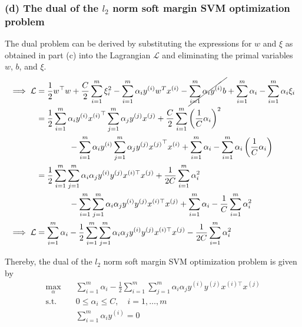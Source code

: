 \subsubsection*{(d) The dual of the \( l_{2} \) norm soft margin SVM optimization problem}

The dual problem can be derived by substituting the expressions for \( w \) and \( \xi \) as obtained in part (c) into the Lagrangian \( \mathcal{L} \) and eliminating the primal variables \( w \), \( b \), and \( \xi \).
\begin{align*}
    \implies
    \mathcal{L}
     & =
    \frac{1}{2} w^\top w
    + \frac{C}{2} \sum_{i=1}^{m} \xi_{i}^{2}
    - \sum_{i=1}^{m} \alpha_{i} y^{(i)} w^{T} x^{(i)}
    - \cancel{ \sum_{i=1}^{m} \alpha_{i} y^{(i)} b }
    + \sum_{i=1}^{m} \alpha_{i}
    - \sum_{i=1}^{m} \alpha_{i} \xi_{i}
    \\ & =
    \frac{1}{2}
    \sum_{i=1}^{m} \alpha_{i} y^{(i)} {x^{(i)}}^\top
    \sum_{j=1}^{m} \alpha_{j} y^{(j)} x^{(j)}
    + \frac{C}{2}
    \sum_{i=1}^{m} {\left( \frac{1}{C} \alpha_{i} \right)}^2
    \\ & \qquad \qquad
    - \sum_{i=1}^{m} \alpha_{i} y^{(i)}
    \sum_{j=1}^{m} \alpha_{j} y^{(j)} {x^{(j)}}^\top x^{(i)}
    + \sum_{i=1}^{m} \alpha_{i}
    - \sum_{i=1}^{m} \alpha_{i} \left( \frac{1}{C} \alpha_{i} \right)
    \\ & =
    \frac{1}{2}
    \sum_{i=1}^{m} \sum_{j=1}^{m} \alpha_{i} \alpha_{j} y^{(i)} y^{(j)} x^{(i) \top} x^{(j)}
    + \frac{1}{2C}
    \sum_{i=1}^{m} \alpha_{i}^{2}
    \\ & \qquad \qquad
    - \sum_{i=1}^{m} \sum_{j=1}^{m} \alpha_{i} \alpha_{j} y^{(i)} y^{(j)} x^{(i) \top} x^{(j)}
    + \sum_{i=1}^{m} \alpha_{i}
    - \frac{1}{C}
    \sum_{i=1}^{m} \alpha_{i}^{2}
    \\
    \implies
    \mathcal{L}
     & =
    \sum_{i=1}^{m} \alpha_{i}
    - \frac{1}{2} \sum_{i=1}^{m} \sum_{j=1}^{m} \alpha_{i} \alpha_{j} y^{(i)} y^{(j)} x^{(i) \top} x^{(j)}
    - \frac{1}{2C}
    \sum_{i=1}^{m} \alpha_{i}^{2}
\end{align*}

Thereby, the dual of the \( l_{2} \) norm soft margin SVM optimization problem is given by
\begin{align*}
    \max_{\alpha}
    \quad &
    \sum_{i=1}^{m} \alpha_{i}
    - \frac{1}{2} \sum_{i=1}^{m} \sum_{j=1}^{m} \alpha_{i} \alpha_{j} y^{(i)} y^{(j)} x^{(i) \top} x^{(j)}
    \\
    \text{s.t.}
    \quad &
    0 \leq \alpha_{i} \leq C
    , \quad i = 1, \ldots, m
    \\ &
    \sum_{i=1}^{m} \alpha_{i} y^{(i)} = 0
\end{align*}
